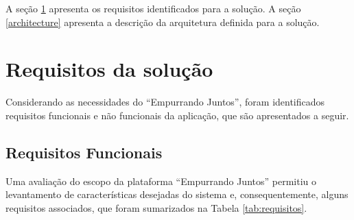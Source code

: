 A seção \ref{requirements} apresenta os requisitos identificados para a solução.
A seção \ref{architecture} apresenta a descrição da arquitetura definida para a solução.

\vfill
\pagebreak

\section{Requisitos da solução} \label{requirements}

    Considerando as necessidades do ``Empurrando Juntos'',
    foram identificados requisitos funcionais e não funcionais da aplicação,
    que são apresentados a seguir.

    \subsection*{Requisitos Funcionais} \label{functional_requirements}

    Uma avaliação do escopo da plataforma ``Empurrando Juntos'' permitiu o levantamento de características desejadas do sistema e,
    consequentemente, alguns requisitos associados, que foram sumarizados na Tabela \ref{tab:requisitos}.

